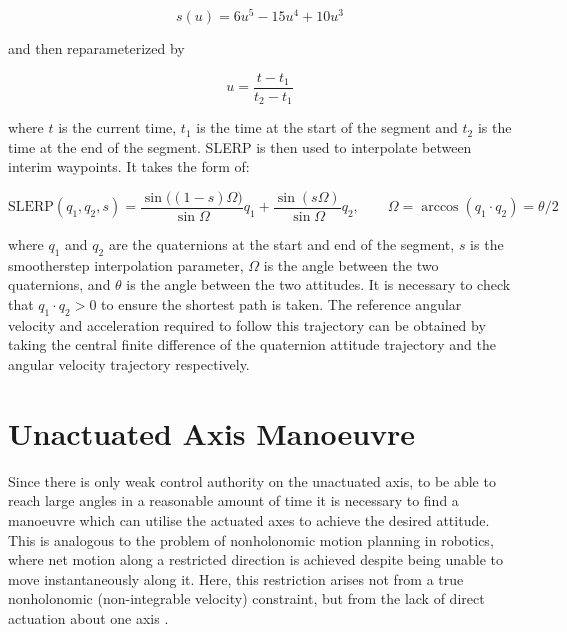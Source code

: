 \begin{equation}
    \label{eq:smootherstep}
    s(u) = 6u^5 - 15u^4 + 10u^3
\end{equation}

and then reparameterized by 

\begin{equation}
    u = \frac{t-t_1}{t_2-t_1}
\end{equation}

where $t$ is the current time, $t_1$ is the time at the start of the segment and $t_2$ is the time at the end of the segment. SLERP is then used to interpolate between interim waypoints. It takes the form of:

\begin{equation}
    \text{SLERP}(q_1,q_2,s) = \frac{\sin\big((1-s)\Omega\big)}{\sin\Omega}q_1 + \frac{\sin(s\Omega)}{\sin\Omega}q_2, \qquad \Omega = \arccos(q_1\cdot q_2) = \theta/2
\end{equation}

where $q_1$ and $q_2$ are the quaternions at the start and end of the segment, $s$ is the smootherstep interpolation parameter, $\Omega$ is the angle between the two quaternions, and $\theta$ is the angle between the two attitudes. It is necessary to check that $q_1 \cdot q_2 > 0$ to ensure the shortest path is taken.
The reference angular velocity and acceleration required to follow this trajectory can be obtained by taking the central finite difference of the quaternion attitude trajectory and the angular velocity trajectory respectively.




\section{Unactuated Axis Manoeuvre}
Since there is only weak control authority on the unactuated axis, to be able to reach large angles in a reasonable amount of time it is necessary to find a manoeuvre which can utilise the actuated axes to achieve the desired attitude. This is analogous to the problem of nonholonomic motion planning in robotics, where net motion along a restricted direction is achieved despite being unable to move instantaneously along it. Here, this restriction arises not from a true nonholonomic (non-integrable velocity) constraint, but from the lack of direct actuation about one axis \cite{murray2017mathematical}.

